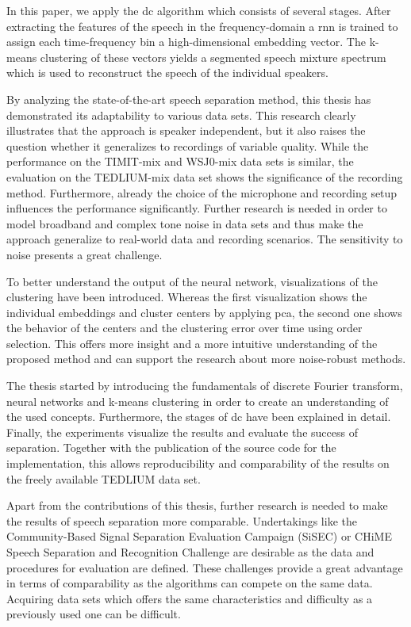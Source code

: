 In this paper, we apply the \acrlong{dc} algorithm which consists of several stages. After extracting the features of the speech in the frequency-domain a \gls{rnn} is trained to assign each time-frequency bin a high-dimensional embedding vector. The k-means clustering of these vectors yields a segmented speech mixture spectrum which is used to reconstruct the speech of the individual speakers.

By analyzing the state-of-the-art speech separation method, this thesis has demonstrated its adaptability to various data sets.
This research clearly illustrates that the approach is speaker independent, but it also raises the question whether it generalizes to recordings of variable quality. While the performance on the TIMIT-mix and WSJ0-mix data sets is similar, the evaluation on the TEDLIUM-mix data set shows the significance of the recording method. Furthermore, already the choice of the microphone and recording setup influences the performance significantly.
Further research is needed in order to model broadband and complex tone noise in data sets and thus make the approach generalize to real-world data and recording scenarios. The sensitivity to noise presents a great challenge.

To better understand the output of the neural network, visualizations of the clustering have been introduced. Whereas the first visualization shows the individual embeddings and cluster centers by applying \gls{pca}, the second one shows the behavior of the centers and the clustering error over time using order selection.
This offers more insight and a more intuitive understanding of the proposed method and can support the research about more noise-robust methods.

The thesis started by introducing the fundamentals of discrete Fourier transform, neural networks and k-means clustering in order to create an understanding of the used concepts. Furthermore, the stages of \acrlong{dc} have been explained in detail. Finally, the experiments visualize the results and evaluate the success of separation. Together with the publication of the source code for the implementation, this allows reproducibility and comparability of the results on the freely available TEDLIUM data set.


Apart from the contributions of this thesis, further research is needed to make the results of speech separation more comparable.
Undertakings like the Community-Based Signal Separation Evaluation Campaign (SiSEC) or CHiME Speech Separation and Recognition Challenge are desirable as the data and procedures for evaluation are defined.
These challenges provide a great advantage in terms of comparability as the algorithms can compete on the same data. Acquiring data sets which offers the same characteristics and difficulty as a previously used one can be difficult.

